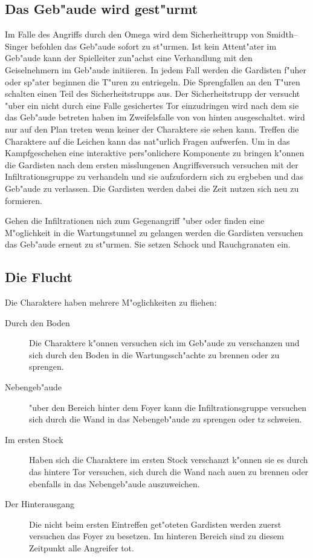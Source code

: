 \subsection{Das Geb"aude wird gest"urmt} 
Im Falle des Angriffs durch den Omega wird dem Sicherheittrupp von Smidth--Singer befohlen das Geb"aude sofort zu st"urmen. Ist kein Attent"ater im Geb"aude kann der Spielleiter zun"achst eine Verhandlung mit den Geiselnehmern im Geb"aude initiieren. In jedem Fall werden die Gardisten f"uher oder sp"ater beginnen die T"uren zu entriegeln. Die Sprengfallen an den T"uren schalten einen Teil des Sicherheitstrupps aus. Der Sicherheitstrupp der versucht "uber ein nicht durch eine Falle gesichertes Tor einzudringen wird nach dem sie das Geb"aude betreten haben im Zweifelsfalle von \xl{} von hinten ausgeschaltet. \xl{} wird nur auf den Plan treten wenn keiner der Charaktere sie sehen kann. Treffen die Charaktere auf die Leichen kann das nat"urlich Fragen aufwerfen. Um in das Kampfgeschehen eine interaktive pers"onlichere Komponente zu bringen k"onnen die Gardisten nach dem ersten misslungenen Angriffsversuch versuchen mit der Infiltrationsgruppe zu verhandeln und sie aufzufordern sich zu ergbeben und das Geb"aude zu verlassen. Die Gardisten werden dabei die Zeit nutzen sich neu zu formieren.

Gehen die Infiltrationen nich zum Gegenangriff "uber oder finden eine M"oglichkeit in die Wartungstunnel zu gelangen werden die Gardisten versuchen das Geb"aude erneut zu st"urmen. Sie setzen Schock und Rauchgranaten ein.

\subsection{Die Flucht} 
Die Charaktere haben mehrere M"oglichkeiten zu fliehen:

\begin{description}
	\item [Durch den Boden] Die Charaktere k"onnen versuchen sich im Geb"aude zu verschanzen und sich durch den Boden in die 		
		Wartungssch"achte zu brennen oder zu sprengen.
	\item [Nebengeb"aude] "uber den Bereich hinter dem Foyer kann die Infiltrationsgruppe versuchen sich durch die Wand in das 		
		Nebengeb"aude zu sprengen oder tz schwei\3en.
	\item [Im ersten Stock] Haben sich die Charaktere im ersten Stock verschanzt k"onnen sie es durch das hintere Tor versuchen, 
		  sich 	durch die Wand nach au\3en zu brennen oder ebenfalls in das Nebengeb"aude auszuweichen.
	\item [Der Hinterausgang] Die nicht beim ersten Eintreffen get"oteten Gardisten werden zuerst versuchen das Foyer zu besetzen. Im hinteren Bereich sind zu diesem Zeitpunkt alle Angreifer tot.	
\end{description}

